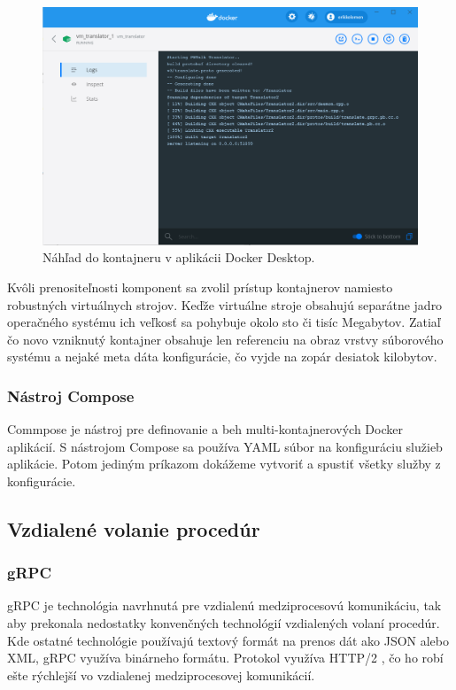 \begin{figure}[H]
	\centering
	\includegraphics[scale=0.5]{obrazky-figures/PC-docker-desktop1}
	\caption{Náhľad do kontajneru v aplikácii Docker Desktop.}
	\label{fig:docker-desktop1}
\end{figure}




Kvôli prenositeľnosti komponent sa zvolil prístup kontajnerov namiesto robustných virtuálnych strojov. Keďže virtuálne stroje obsahujú separátne jadro operačného systému ich veľkosť sa pohybuje okolo sto či tisíc Megabytov. Zatiaľ čo novo vzniknutý kontajner obsahuje len referenciu na obraz vrstvy súborového systému a nejaké meta dáta konfigurácie, čo vyjde na zopár desiatok kilobytov. \cite{kane2018docker}

\subsubsection{Nástroj Compose}

Commpose je nástroj pre definovanie a beh multi-kontajnerových Docker aplikácií. S nástrojom Compose sa používa YAML súbor na konfiguráciu služieb aplikácie. Potom jediným príkazom dokážeme vytvoriť a spustiť všetky služby z konfigurácie. \cite{docker_docs}

\subsection{Vzdialené volanie procedúr}

\subsubsection{gRPC}
gRPC je technológia navrhnutá pre vzdialenú medziprocesovú komunikáciu, tak aby prekonala nedostatky konvenčných technológií vzdialených volaní procedúr. Kde ostatné technológie používajú textový formát na prenos dát ako JSON alebo XML, gRPC využíva binárneho formátu. Protokol využíva HTTP/2 \cite{kuruppu2019grpc}, čo ho robí ešte rýchlejší vo vzdialenej medziprocesovej komunikácií.

